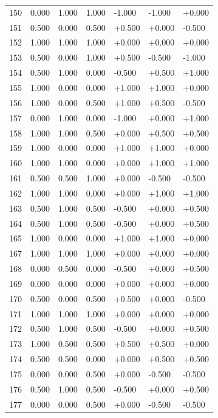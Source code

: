 \documentclass[
]{article}
\begin{document}
{\begin{longtable}[]{@{}lllllll@{}}
150 & 0.000 & 1.000 & 1.000 & -1.000 & -1.000 & +0.000 \\
151 & 0.500 & 0.000 & 0.500 & +0.500 & +0.000 & -0.500 \\
152 & 1.000 & 1.000 & 1.000 & +0.000 & +0.000 & +0.000 \\
153 & 0.500 & 0.000 & 1.000 & +0.500 & -0.500 & -1.000 \\
154 & 0.500 & 1.000 & 0.000 & -0.500 & +0.500 & +1.000 \\
155 & 1.000 & 0.000 & 0.000 & +1.000 & +1.000 & +0.000 \\
156 & 1.000 & 0.000 & 0.500 & +1.000 & +0.500 & -0.500 \\
157 & 0.000 & 1.000 & 0.000 & -1.000 & +0.000 & +1.000 \\
158 & 1.000 & 1.000 & 0.500 & +0.000 & +0.500 & +0.500 \\
159 & 1.000 & 0.000 & 0.000 & +1.000 & +1.000 & +0.000 \\
160 & 1.000 & 1.000 & 0.000 & +0.000 & +1.000 & +1.000 \\
161 & 0.500 & 0.500 & 1.000 & +0.000 & -0.500 & -0.500 \\
162 & 1.000 & 1.000 & 0.000 & +0.000 & +1.000 & +1.000 \\
163 & 0.500 & 1.000 & 0.500 & -0.500 & +0.000 & +0.500 \\
164 & 0.500 & 1.000 & 0.500 & -0.500 & +0.000 & +0.500 \\
165 & 1.000 & 0.000 & 0.000 & +1.000 & +1.000 & +0.000 \\
167 & 1.000 & 1.000 & 1.000 & +0.000 & +0.000 & +0.000 \\
168 & 0.000 & 0.500 & 0.000 & -0.500 & +0.000 & +0.500 \\
169 & 0.000 & 0.000 & 0.000 & +0.000 & +0.000 & +0.000 \\
170 & 0.500 & 0.000 & 0.500 & +0.500 & +0.000 & -0.500 \\
171 & 1.000 & 1.000 & 1.000 & +0.000 & +0.000 & +0.000 \\
172 & 0.500 & 1.000 & 0.500 & -0.500 & +0.000 & +0.500 \\
173 & 1.000 & 0.500 & 0.500 & +0.500 & +0.500 & +0.000 \\
174 & 0.500 & 0.500 & 0.000 & +0.000 & +0.500 & +0.500 \\
175 & 0.000 & 0.000 & 0.500 & +0.000 & -0.500 & -0.500 \\
176 & 0.500 & 1.000 & 0.500 & -0.500 & +0.000 & +0.500 \\
177 & 0.000 & 0.000 & 0.500 & +0.000 & -0.500 & -0.500 \\

\end{longtable}}
\end{document}
